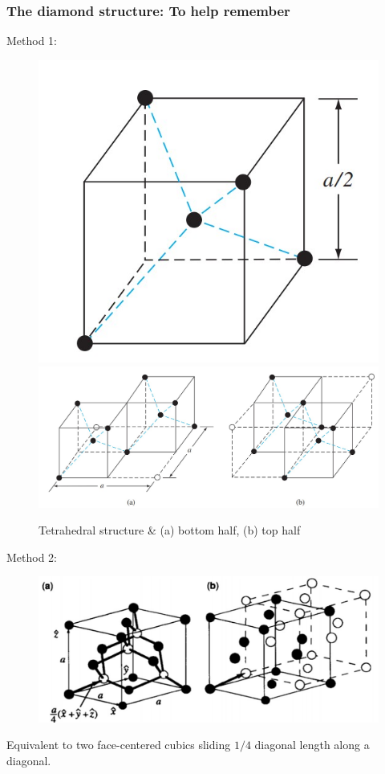 \documentclass{beamer}
\begin{document}
    \begin{frame} \frametitle{The diamond structure: To help remember}
        Method 1:
        \begin{figure}[H]
            \centering
            \includegraphics[width=0.2\linewidth]{Zincblend_tetrahedral_structure.jpg}
            \includegraphics[width=0.5\linewidth]{Zincblend_memory_method_1.jpg}
            \caption{Tetrahedral structure \& (a) bottom half, (b) top half}
            \label{fig:Zincblend_memory_method_1.jpg}
        \end{figure}

        Method 2:
        \begin{figure}[H]
            \centering
            \includegraphics[width=0.5\linewidth]{Zincblend_memory_method_2.jpg}
            \label{fig:Zincblend_memory_method_2.jpg}
        \end{figure}
        Equivalent to two face-centered cubics sliding $1/4$ diagonal length along a diagonal.
    \end{frame}
\end{document}

